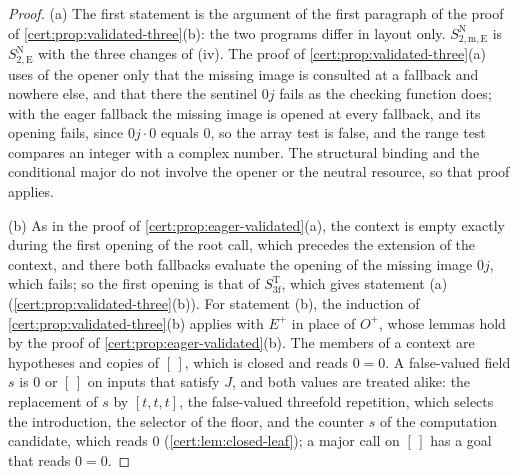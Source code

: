 \begin{proof}
(a) The first statement is the argument of the first paragraph of the proof of
\cref{cert:prop:validated-three}(b): the two programs differ in layout only.
$S^{\mathrm N}_{2,\mathrm{m,E}}$ is $S^{\mathrm N}_{2,\mathrm E}$ with the three
changes of (iv). The proof of \cref{cert:prop:validated-three}(a) uses of the
opener only that the missing image is consulted at a fallback and nowhere else, and
that there the sentinel $0j$ fails as the checking function does; with the eager
fallback the missing image is opened at every fallback, and its opening fails, since
$0j\cdot 0$ equals $0$, so the array test is false, and the range test compares an
integer with a complex number. The structural binding and the conditional major do
not involve the opener or the neutral resource, so that proof applies.

(b) As in the proof of \cref{cert:prop:eager-validated}(a), the context is empty
exactly during the first opening of the root call, which precedes the extension of
the context, and there both fallbacks evaluate the opening of the missing image $0j$,
which fails; so the first opening is that of $S^{\mathrm T}_{3\mathrm f}$, which gives
statement (a) (\cref{cert:prop:validated-three}(b)). For statement (b), the
induction of \cref{cert:prop:validated-three}(b) applies with $E^{+}$ in place of
$O^{+}$, whose lemmas hold by the proof of \cref{cert:prop:eager-validated}(b). The
members of a context are hypotheses and copies of $[\,]$, which is closed and reads
$0=0$. A false-valued field $s$ is $0$ or $[\,]$ on inputs that satisfy $J$, and both
values are treated alike: the replacement of $s$ by $[t,t,t]$, the false-valued
threefold repetition, which selects the introduction, the selector of the floor, and
the counter $s$ of the computation candidate, which reads $0$
(\cref{cert:lem:closed-leaf}); a major call on $[\,]$ has a goal that reads $0=0$.


\end{proof}
